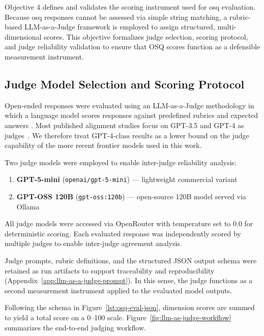Objective 4 defines and validates the scoring instrument used for \ac{osq} evaluation. Because \ac{osq} responses cannot be assessed via simple string matching, a rubric-based LLM-as-a-Judge framework is employed to assign structured, multi-dimensional scores. This objective formalizes judge selection, scoring protocol, and judge reliability validation to ensure that OSQ scores function as a defensible measurement instrument.


\subsection{Judge Model Selection and Scoring Protocol}
\label{subsec:ch3_obj4_judge_model}

Open-ended responses were evaluated using an LLM-as-a-Judge methodology in which a language model scores responses against predefined rubrics and expected answers \cite{zheng_JudgingLLMasaJudgeMTBench_2023}. Most published alignment studies focus on GPT-3.5 and GPT-4 as judges~\cite{zheng_JudgingLLMasaJudgeMTBench_2023, gu_survey_on_llm_as_a_judge_2025,
thakurJudgingJudgesEvaluating2025}. We therefore treat GPT-4-class results as a lower bound on the judge capability of the more recent frontier models used in this work.

Two judge models were employed to enable inter-judge reliability analysis:

\begin{enumerate}
    \item \textbf{GPT-5-mini} (\texttt{openai/gpt-5-mini}) --- lightweight commercial variant
    \item \textbf{GPT-OSS 120B} (\texttt{gpt-oss:120b}) --- open-source 120B model served via Ollama
\end{enumerate}

All judge models were accessed via OpenRouter with temperature set to 0.0 for deterministic scoring. Each evaluated response was independently scored by multiple judges to enable inter-judge agreement analysis.

Judge prompts, rubric definitions, and the structured JSON output schema were retained as run artifacts to support traceability and reproducibility (Appendix~\ref{app:llm-as-a-judge-prompt}). In this sense, the judge functions as a second measurement instrument applied to the evaluated model outputs.

Following the schema in Figure~\ref{lst:osq-eval-json}, dimension scores are summed to yield a total score on a 0--100 scale. Figure~\ref{fig:llm-as-judge-workflow} summarizes the end-to-end judging workflow.


